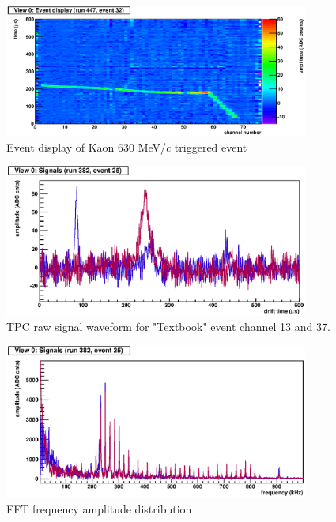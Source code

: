 \documentclass{cernyrep}
\begin{document}
\begin{figure}[htbp]
 \begin{center}
  \includegraphics[width=100mm]{Kmunu.eps}
 \end{center}
 \caption{Event display of Kaon 630 MeV/$c$ triggered event}
 \label{Fig:Kmunu}
\end{figure}

\begin{figure}[htbp]
 \begin{center}
  \includegraphics[width=100mm]{beforeFFT.eps}
 \end{center}
 \caption{TPC raw signal waveform for "Textbook" event channel 13 and 37.}
 \label{Fig:beforeFFT}
\end{figure}

\begin{figure}[htbp]
 \begin{center}
  \includegraphics[width=100mm]{FFT.eps}
 \end{center}
 \caption{FFT frequency amplitude distribution}
 \label{Fig:beforeFFT}
\end{figure}
\end{document}
